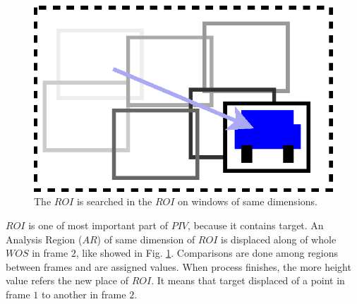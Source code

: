\begin{figure}[H]
\includegraphics[width=\columnwidth]{images/WOSdivided.eps}
\caption{The $ROI$ is searched in the $ROI$ on windows of same dimensions. }
\label{fig:WOSdivided}
\end{figure}

$ROI$ is one of most important part of $PIV$, because it contains target. An Analysis Region ($AR$)
of same dimension of $ROI$ is displaced
along of whole $WOS$ in frame $2$, like showed in Fig. \ref{fig:WOSdivided}. Comparisons are done among regions between frames and are 
assigned values. 
When process finishes, the more height value refers the new place of $ROI$. It means that target displaced of a point in 
frame $1$ to another in frame $2$.